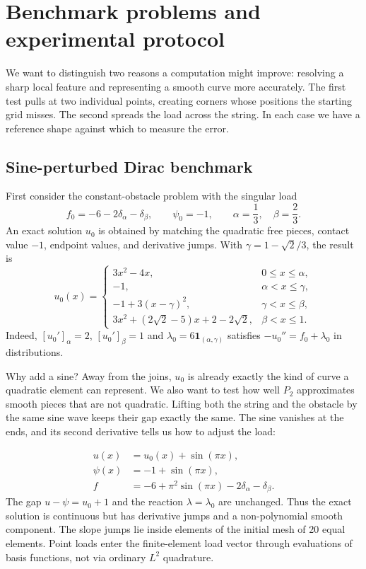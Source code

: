 \documentclass[11pt,a4paper]{article}
\newcommand{\sect}[1]{\Needspace{7\baselineskip}\section{#1}}
\newcommand{\subsect}[1]{\Needspace{5\baselineskip}\subsection{#1}}
\begin{document}
\sect{Benchmark problems and experimental protocol}\label{sec:benchmarks}
We want to distinguish two reasons a computation might improve: resolving a sharp local feature and representing a smooth curve more accurately. The first test pulls at two individual points, creating corners whose positions the starting grid misses. The second spreads the load across the string. In each case we have a reference shape against which to measure the error.

\subsect{Sine-perturbed Dirac benchmark}\label{sec:sine-dirac}
First consider the constant-obstacle problem with the singular load
\[
 f_0=-6-2\delta_\alpha-\delta_\beta,\qquad
 \psi_0=-1,\qquad \alpha=\frac13,\quad\beta=\frac23.
\]
An exact solution $u_0$ is obtained by matching the quadratic free pieces,
contact value $-1$, endpoint values, and derivative jumps. With
$\gamma=1-\sqrt2/3$, the result is
\[
 u_0(x)=\begin{cases}
 3x^2-4x,&0\leq x\leq\alpha,\\
 -1,&\alpha<x\leq\gamma,\\
 -1+3(x-\gamma)^2,&\gamma<x\leq\beta,\\
 3x^2+(2\sqrt2-5)x+2-2\sqrt2,&\beta<x\leq1.
 \end{cases}
\]
Indeed, $[u_0']_\alpha=2$, $[u_0']_\beta=1$ and
$\lambda_0=6\mathbf 1_{(\alpha,\gamma)}$ satisfies
$-u_0''=f_0+\lambda_0$ in distributions.

Why add a sine? Away from the joins, $u_0$ is already exactly the kind of curve a quadratic element can represent. We also want to test how well $P_2$ approximates smooth pieces that are not quadratic. Lifting both the string and the obstacle by the same sine wave keeps their gap exactly the same. The sine vanishes at the ends, and its second derivative tells us how to adjust the load:

\begin{equation}\label{eq:sine-case}
 \boxed{\begin{aligned}
  u(x)&=u_0(x)+\sin(\pi x),\\
  \psi(x)&=-1+\sin(\pi x),\\
  f&=-6+\pi^2\sin(\pi x)-2\delta_\alpha-\delta_\beta.
 \end{aligned}}
\end{equation}
The gap $u-\psi=u_0+1$ and the reaction $\lambda=\lambda_0$ are unchanged.
Thus the exact solution is continuous but has derivative jumps and a
non-polynomial smooth component. The slope jumps lie inside elements of
the initial mesh of 20 equal elements. Point loads enter the finite-element
load vector through evaluations of basis functions, not via ordinary
$L^2$ quadrature.
\end{document}
